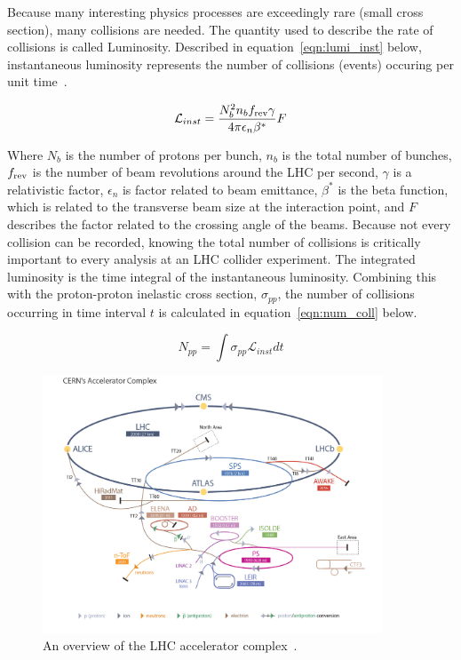 \noindent Because many interesting physics processes are exceedingly rare (small cross section), many collisions
are needed. The quantity used to describe the rate of collisions is called Luminosity.
Described in equation~\ref{eqn:lumi_inst} below, instantaneous luminosity represents the number of collisions (events) occuring per unit time~\cite{lhc_bluebook}.

\begin{equation}
\label{eqn:lumi_inst}
\mathcal{L}_{inst} = \frac{N_{b}^{2}n_{b}f_{\textnormal{rev}}\gamma}{4\pi \epsilon_{n} \beta^{*}}F
\end{equation}

Where $N_{b}$ is the number of protons per bunch, $n_{b}$ is the total number of bunches, $f_{\textnormal{rev}}$ is the number of beam revolutions around the LHC per
second, $\gamma$ is a relativistic factor, $\epsilon_{n}$ is factor related to beam emittance, $\beta^{*}$ is the beta function, which is related to the transverse beam size
at the interaction point, and
$F$ describes the factor related to the crossing angle of the beams. Because not every collision can be recorded, knowing the total number of collisions is critically important
to every analysis at an LHC collider experiment. The integrated luminosity is the time integral of the instantaneous luminosity. Combining this with the proton-proton inelastic
cross section, $\sigma_{pp}$, the number of collisions occurring in time interval $t$ is calculated in equation~\ref{eqn:num_coll} below. 

\begin{equation}
\label{eqn:num_coll}
N_{pp} = \int \sigma_{pp}\mathcal{L}_{inst}dt 
\end{equation}


\begin{figure}[hbtp]
 \begin{center}
   \includegraphics[width=0.9\textwidth]{ch3_figs/lhc_complex.pdf}
   \caption[Overview of the LHC accelerator complex]{An overview of the LHC accelerator complex~\cite{lhcfig}.}
   \label{fig:lhc_complex}
 \end{center}
\end{figure}


